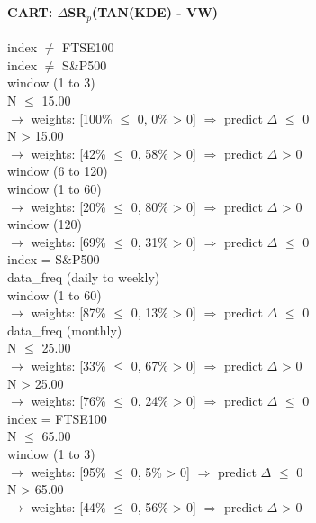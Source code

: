 \
\paragraph{CART: $\Delta$SR$_p$(TAN(KDE) - VW)}

\begin{flushleft}
\ttfamily %
index $\neq$ FTSE100 \\
\quad index $\neq$ S\&P500 \\
\quad \quad window (1 to 3) \\
\quad \quad \quad N $\leq$ 15.00 \\
\quad \quad \quad \quad $\rightarrow$ weights: [100\% $\leq$ 0, 0\% > 0] $\Rightarrow$ predict $\Delta$ $\leq$ 0 \\
\quad \quad \quad N > 15.00 \\
\quad \quad \quad \quad $\rightarrow$ weights: [42\% $\leq$ 0, 58\% > 0] $\Rightarrow$ predict $\Delta$ > 0 \\
\quad \quad window (6 to 120) \\
\quad \quad \quad window (1 to 60) \\
\quad \quad \quad \quad $\rightarrow$ weights: [20\% $\leq$ 0, 80\% > 0] $\Rightarrow$ predict $\Delta$ > 0 \\
\quad \quad \quad window (120) \\
\quad \quad \quad \quad $\rightarrow$ weights: [69\% $\leq$ 0, 31\% > 0] $\Rightarrow$ predict $\Delta$ $\leq$ 0 \\
\quad index = S\&P500 \\
\quad \quad data\_freq (daily to weekly) \\
\quad \quad \quad window (1 to 60) \\
\quad \quad \quad \quad $\rightarrow$ weights: [87\% $\leq$ 0, 13\% > 0] $\Rightarrow$ predict $\Delta$ $\leq$ 0 \\
\quad \quad data\_freq (monthly) \\
\quad \quad \quad N $\leq$ 25.00 \\
\quad \quad \quad \quad $\rightarrow$ weights: [33\% $\leq$ 0, 67\% > 0] $\Rightarrow$ predict $\Delta$ > 0 \\
\quad \quad \quad N > 25.00 \\
\quad \quad \quad \quad $\rightarrow$ weights: [76\% $\leq$ 0, 24\% > 0] $\Rightarrow$ predict $\Delta$ $\leq$ 0 \\
index = FTSE100 \\
\quad N $\leq$ 65.00 \\
\quad \quad window (1 to 3) \\
\quad \quad \quad \quad $\rightarrow$ weights: [95\% $\leq$ 0, 5\% > 0] $\Rightarrow$ predict $\Delta$ $\leq$ 0 \\
\quad N > 65.00 \\
\quad \quad \quad \quad $\rightarrow$ weights: [44\% $\leq$ 0, 56\% > 0] $\Rightarrow$ predict $\Delta$ > 0 \\
\end{flushleft}
